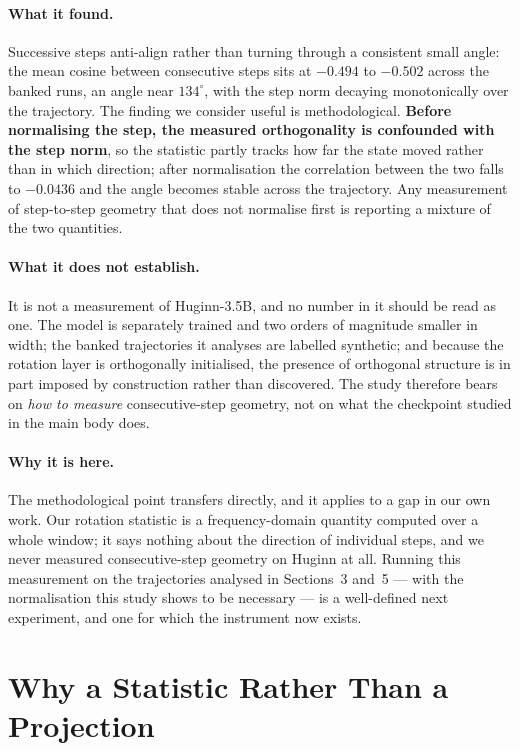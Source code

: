 \documentclass{zapiski}
\begin{document}
\paragraph{What it found.} Successive steps anti-align rather than turning through a consistent
small angle: the mean cosine between consecutive steps sits at $-0.494$ to $-0.502$ across the
banked runs, an angle near $134^\circ$, with the step norm decaying monotonically over the
trajectory. The finding we consider useful is methodological. \textbf{Before normalising the step,
the measured orthogonality is confounded with the step norm}, so the statistic partly tracks how
far the state moved rather than in which direction; after normalisation the correlation between the
two falls to $-0.0436$ and the angle becomes stable across the trajectory. Any measurement of
step-to-step geometry that does not normalise first is reporting a mixture of the two quantities.

\paragraph{What it does not establish.} It is not a measurement of Huginn-3.5B, and no number in it
should be read as one. The model is separately trained and two orders of magnitude smaller in
width; the banked trajectories it analyses are labelled synthetic; and because the rotation layer is
orthogonally initialised, the presence of orthogonal structure is in part imposed by construction
rather than discovered. The study therefore bears on \emph{how to measure} consecutive-step
geometry, not on what the checkpoint studied in the main body does.

\paragraph{Why it is here.} The methodological point transfers directly, and it applies to a gap in
our own work. Our rotation statistic is a frequency-domain quantity computed over a whole window;
it says nothing about the direction of individual steps, and we never measured consecutive-step
geometry on Huginn at all. Running this measurement on the trajectories analysed in
Sections~3 and~5 --- with the normalisation this study shows to be necessary --- is a well-defined
next experiment, and one for which the instrument now exists.

\section{Why a Statistic Rather Than a Projection}
\end{document}
